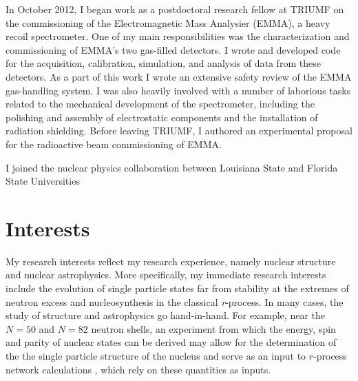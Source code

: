 {In October 2012, I began work as a postdoctoral research fellow at TRIUMF%
on the commissioning of the Electromagnetic Mass Analysier (EMMA), a heavy recoil 
spectrometer. %
 One of my main responsibilities was the characterization and commissioning of EMMA's two gas-filled detectors. %
 I wrote and developed code for the acquisition, calibration, simulation, and analysis of data from these detectors. 
As a part of this work I wrote an extensive safety review of the EMMA gas-handling system. I was also heavily involved with a number of laborious tasks related to the mechanical development of the spectrometer, including the polishing and assembly of  electrostatic components and the installation of radiation shielding.
		Before leaving TRIUMF, I authored an experimental proposal for the radioactive beam commissioning of EMMA.
		
		
		I joined the nuclear physics collaboration between Louisiana State and Florida State Universities

\section*{Interests}
My research interests reflect my research experience, namely nuclear structure and nuclear astrophysics.  More specifically, my immediate 
research interests include %
 the evolution of single particle states far from stability at the extremes of neutron excess and nucleosynthesis in the classical \textit{r}-process. %
 In many cases, the study of structure
and astrophysics go hand-in-hand. For example, %
near the $N=50$ and $N=82$ neutron shells,  
an experiment from which 
the energy, spin and parity of nuclear states can be derived may allow for the determination of the 
the single particle structure of the nucleus and serve as an input to 
$r$-process%
network calculations 
, which
 rely on these quantities as inputs. %

}
